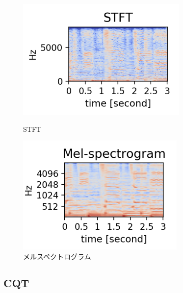 \begin{figure}[b]
\centering
\begin{minipage}{0.48\columnwidth}
\centering
\includegraphics[width=\columnwidth]{figure/stft.png}
\caption{STFT}
\label{fig:STFT}
\end{minipage}
\begin{minipage}{0.48\columnwidth}
\centering
\includegraphics[width=\columnwidth]{figure/mel.png}
\caption{メルスペクトログラム}
\label{fig:mel}
\end{minipage}
\end{figure}

\clearpage

\subsection{CQT}

